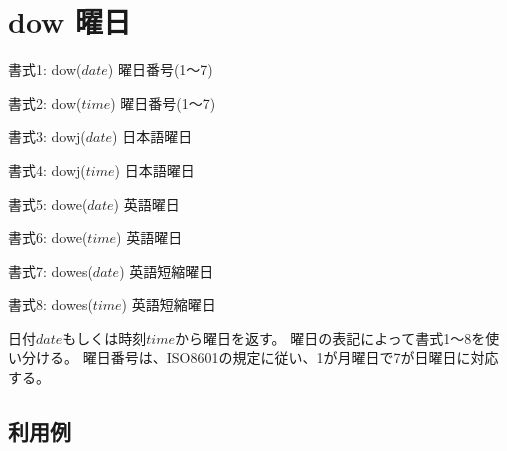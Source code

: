 
%

\section{dow 曜日\label{sect:dow}}

書式1: dow($date$) 曜日番号(1〜7)

書式2: dow($time$) 曜日番号(1〜7)

書式3: dowj($date$) 日本語曜日

書式4: dowj($time$) 日本語曜日

書式5: dowe($date$) 英語曜日

書式6: dowe($time$) 英語曜日

書式7: dowes($date$) 英語短縮曜日

書式8: dowes($time$) 英語短縮曜日

日付$date$もしくは時刻$time$から曜日を返す。
曜日の表記によって書式1〜8を使い分ける。
曜日番号は、ISO8601の規定に従い、1が月曜日で7が日曜日に対応する。
\subsection*{利用例}


%

